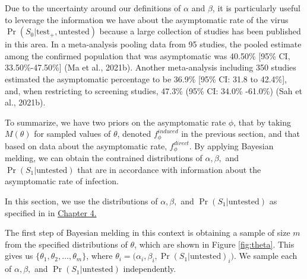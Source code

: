 \documentclass[12pt,twoside]{smiththesis}
\begin{document}
Due to the uncertainty around our definitions of \(\alpha\) and \(\beta\), it is particularly useful to leverage the information we have about the asymptomatic rate of the virus \(\Pr(S_0|\text{test}_+,\text{untested})\) because a large collection of studies has been published in this area. In a meta-analysis pooling data from 95 studies, the pooled estimate among the confirmed population that was asymptomatic was 40.50\% {[}95\% CI, 33.50\%-47.50\%{]} (Ma et al., 2021b). Another meta-analysis including 350 studies estimated the asymptomatic percentage to be 36.9\% {[}95\% CI: 31.8 to 42.4\%{]}, and, when restricting to screening studies, 47.3\% (95\% CI: 34.0\% -61.0\%) (Sah et al., 2021b).

To summarize, we have two priors on the asymptomatic rate \(\phi\), that by taking \(M(\theta)\) for sampled values of \(\theta\), denoted \(f_\phi^{induced}\) in the previous section, and that based on data about the asymptomatic rate, \(f_\phi^{direct}\). By applying Bayesian melding, we can obtain the contrained distributions of \(\alpha,\beta,\) and \(\Pr(S_1|\text{untested})\) that are in accordance with information about the asymptomatic rate of infection.

In this section, we use the distributions of \(\alpha,\beta,\) and \(\Pr(S_1|\text{untested})\) as specified in in \protect\hyperlink{defpriors}{Chapter 4.}

\newpage

The first step of Bayesian melding in this context is obtaining a sample of size \(m\) from the specified distributions of \(\theta\), which are shown in Figure \ref{fig:theta}. This gives us \(\{ \theta_1, \theta_2, \dots, \theta_m\}\), where \(\theta_i = \Big(\alpha_i,\beta_i,\Pr(S_1|\text{untested})_i\Big)\). We sample each of \(\alpha,\beta,\) and \(\Pr(S_1|\text{untested})\) independently.
\end{document}
